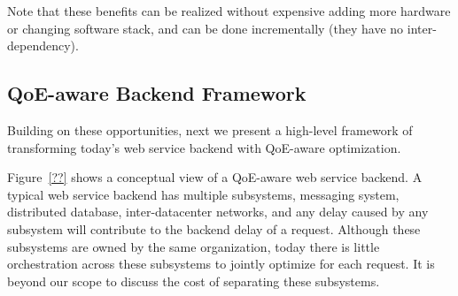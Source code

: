 Note that these benefits can be realized without expensive adding more hardware or changing software stack, and can be done incrementally (they have no inter-dependency).


\subsection{QoE-aware Backend Framework}
Building on these opportunities, next we present a high-level framework of transforming today's web service backend with QoE-aware optimization.

Figure~\ref{??} shows a conceptual view of a QoE-aware web service backend. 
A typical web service backend has multiple subsystems, \eg messaging system, distributed database, inter-datacenter networks, and any delay caused by any subsystem will contribute to the backend delay of a request.
Although these subsystems are owned by the same organization, today there is little orchestration across these subsystems to jointly optimize for each request. 
It is beyond our scope to discuss the cost of separating these subsystems. 

